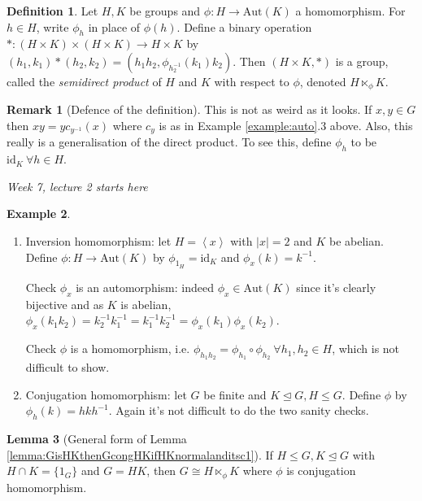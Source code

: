 \documentclass[a4paper]{article}
\newcommand{\la}{\left\langle}
\newcommand{\ra}{\right\rangle}
\newcommand{\Aut}{\text{Aut}}
\newcommand{\id}{\text{id}}
\theoremstyle{definition}
\newtheorem{defn}{Definition}[subsection]
\newtheorem{lemma}[defn]{Lemma}
\newtheorem{example}[defn]{Example}
\newtheorem*{remark}{Remark}
\begin{document}
\begin{defn}
Let $H,K$ be groups and $\phi:H\rightarrow \Aut(K)$ a homomorphism. For $h\in H$, write $\phi_h$ in place of $\phi(h)$. Define a binary operation $\ast:(H\times K)\times(H\times K)\rightarrow H\times K$ by $(h_1,k_1)\ast (h_2,k_2) = \left(h_1h_2,\phi_{h_2^{-1}} (k_1)k_2\right)$. Then $(H\times K,\ast)$ is a group, called the \textit{semidirect product} of $H$ and $K$ with respect to $\phi$, denoted $H\ltimes_\phi K$.
\end{defn}

\begin{remark}[Defence of the definition]
This is not as weird as it looks. If $x,y\in G$ then $xy=yc_{y^{-1}}(x)$ where $c_y$ is as in Example \ref{example:auto}.3 above. Also, this really is a generalisation of the direct product. To see this, define $\phi_h$ to be $\id_K \ \forall h\in H$.
\end{remark}

\begin{flushright}
\textit{Week 7, lecture 2 starts here}
\end{flushright}

\begin{example}
\begin{enumerate}
\item Inversion homomorphism: let $H=\la x\ra$ with $|x|=2$ and $K$ be abelian. Define $\phi:H\rightarrow\Aut(K)$ by $\phi_{1_H}=\id_K$ and $\phi_x(k)=k^{-1}$.

Check $\phi_x$ is an automorphism: indeed $\phi_x\in\Aut(K)$ since it's clearly bijective and as $K$ is abelian, $\phi_x(k_1k_2)=k_2^{-1}k_1^{-1}=k_1^{-1}k_2^{-1}=\phi_x(k_1)\phi_x(k_2)$.

Check $\phi$ is a homomorphism, i.e. $\phi_{h_1h_2}=\phi_{h_1}\circ\phi_{h_2} \ \forall h_1,h_2\in H$, which is not difficult to show.
\item Conjugation homomorphism: let $G$ be finite and $K\unlhd G,H\leq G$. Define $\phi$ by $\phi_h(k)=hkh^{-1}$. Again it's not difficult to do the two sanity checks.
\end{enumerate}
\end{example}

\begin{lemma}[General form of Lemma \ref{lemma:GisHKthenGcongHKifHKnormalanditsc1}]
\label{lemma:generalformofHKcongHsK}
If $H\leq G,K\unlhd G$ with $H\cap K=\{1_G\}$ and $G=HK$, then $G\cong H\ltimes_\phi K$ where $\phi$ is conjugation homomorphism.
\end{lemma}
\end{document}
